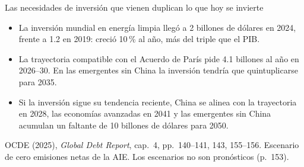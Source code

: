 \documentclass[aspectratio=169,11pt]{beamer}
\newcommand{\fuente}[1]{\par\vfill{\small\color{cGris}#1\par}}
\newcommand{\GDR}{OCDE (2025), \emph{Global Debt Report}}
\begin{document}
\begin{frame}{Las necesidades de inversión que vienen duplican lo que hoy se invierte}
  \begin{itemize}
    \item<1-> La inversión mundial en energía limpia llegó a 2 billones de dólares en 2024, frente a 1.2 en 2019: creció 10\,\% al año, más del triple que el PIB.
    \item<2-> La trayectoria compatible con el Acuerdo de París pide 4.1 billones al año en 2026--30. En las emergentes sin China la inversión tendría que quintuplicarse para 2035.
    \item<3-> Si la inversión sigue su tendencia reciente, China se alinea con la trayectoria en 2028, las economías avanzadas en 2041 y las emergentes sin China acumulan un faltante de 10 billones de dólares para 2050.
  \end{itemize}
  \fuente{\GDR, cap.~4, pp.~140--141, 143, 155--156. Escenario de cero emisiones netas de la AIE. Los escenarios no son pronósticos (p.~153).}
\end{frame}
\end{document}
